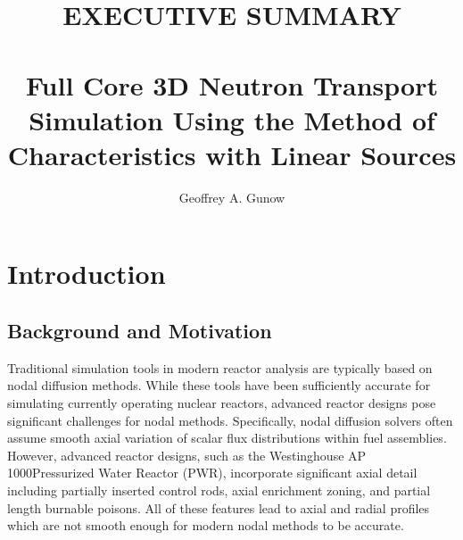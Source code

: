 \documentclass[12pt,twoside]{mitthesis-exec}
\begin{document}



\title{EXECUTIVE SUMMARY \\~\\ Full Core 3D Neutron Transport Simulation Using the Method of Characteristics with Linear Sources}

\author{Geoffrey A. Gunow}








\singlespacing 

\section*{Introduction}

\subsection*{Background and Motivation}

Traditional simulation tools in modern reactor analysis are typically based on nodal diffusion methods. While these tools have been sufficiently accurate for simulating currently operating nuclear reactors, advanced reactor designs pose significant challenges for nodal methods. Specifically, nodal diffusion solvers often assume smooth axial variation of scalar flux distributions within fuel assemblies. However, advanced reactor designs, such as the Westinghouse AP 1000\texttrademark Pressurized Water Reactor (PWR), incorporate significant axial detail including partially inserted control rods, axial enrichment zoning, and partial length burnable poisons. All of these features lead to axial and radial profiles which are not smooth enough for modern nodal methods to be accurate.
\end{document}
